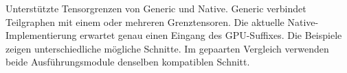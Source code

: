 Unterstützte Tensorgrenzen von Generic und Native. Generic verbindet Teilgraphen mit einem oder mehreren Grenztensoren. Die aktuelle Native-Implementierung erwartet genau einen Eingang des GPU-Suffixes. Die Beispiele zeigen unterschiedliche mögliche Schnitte. Im gepaarten Vergleich verwenden beide Ausführungsmodule denselben kompatiblen Schnitt.
